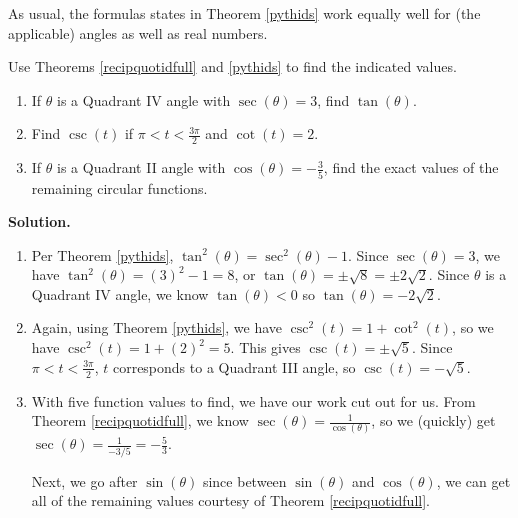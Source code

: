 \documentclass{ximera}
\begin{document}
\smallskip

As usual, the formulas states in Theorem \ref{pythids} work equally well for (the applicable) angles as well as real numbers.

\smallskip

\begin{example} \label{usingidtofindvaluesex1}  Use Theorems \ref{recipquotidfull}   and \ref{pythids}  to find the indicated values.

\begin{enumerate}

\item  If $\theta$ is a Quadrant IV angle with $\sec(\theta) = 3$, find $\tan(\theta)$.

\item   Find $\csc(t)$ if  $\pi < t < \frac{3\pi}{2}$ and $\cot(t) = 2$.

\item  If $\theta$ is a Quadrant II angle with $\cos(\theta) = -\frac{3}{5}$, find the exact values of the remaining circular functions.

\end{enumerate}

{\bf Solution.}

\begin{enumerate}

\item  Per Theorem  \ref{pythids}, $\tan^{2}(\theta) = \sec^{2}(\theta) -1$.  Since  $\sec(\theta) = 3$, we have $\tan^{2}(\theta) = (3)^2 - 1 = 8$, or  $\tan(\theta) = \pm \sqrt{8} = \pm 2 \sqrt{2}$. Since $\theta$ is a Quadrant IV angle, we know $\tan(\theta) < 0$ so $\tan(\theta) = -2\sqrt{2}$.

\item  Again, using Theorem  \ref{pythids}, we have $\csc^{2}(t) = 1 + \cot^{2}(t)$, so we have $\csc^{2}(t) = 1 + (2)^2 = 5$.  This gives $\csc(t) = \pm \sqrt{5}$.  Since $\pi < t < \frac{3\pi}{2}$, $t$ corresponds to   a Quadrant III angle, so $\csc(t) = -\sqrt{5}$.

\item  With five function values to find, we have our work cut out for us.  From Theorem \ref{recipquotidfull}, we know $\sec(\theta) = \frac{1}{\cos(\theta)}$, so we (quickly) get $\sec(\theta) = \frac{1}{-3/5} = - \frac{5}{3}$.  

\smallskip

Next, we go after $\sin(\theta)$  since between $\sin(\theta)$ and  $\cos(\theta)$, we can get all of the remaining values courtesy of Theorem \ref{recipquotidfull}. 


\end{enumerate}
\end{example}
\end{document}
